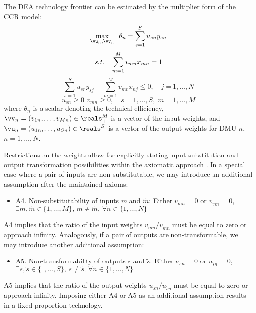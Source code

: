 {The DEA technology frontier can be estimated by the multiplier form of the CCR model:
\begin{equation}\label{eq:CCR}
\max_{\vu_n, \vv_n} \,\ \theta_{n}=\sum_{s=1}^S u_{sn} y_{sn}
\end{equation}
\begin{equation*}
\mbox{\textit{s.t.}}\quad
\sum_{m=1}^M v_{mn} x_{mn}=1    
\end{equation*}
\begin{equation*}
\sum_{s=1}^S u_{sn} y_{sj}-\sum_{m=1}^M v_{mn} x_{nj} \leq 0, \quad j = 1, \ldots, N
\end{equation*}
\begin{equation*}
u_{sn} \ge 0,v_{mn} \ge 0, \quad s = 1, \ldots, S, \; m = 1, \ldots, M
\end{equation*}
where $\theta_{n}$ is a scalar denoting the technical efficiency, $\vv_n = (v_{1n}, \ldots, v_{Mn}) \in \reals_+^M$ is a vector of the input weights, and $\vu_n = (u_{1n}, \ldots, u_{Sn}) \in \reals_+^S$ is a vector of the output weights for DMU $n$, $n = 1, \ldots, N$.

Restrictions on the weights allow for explicitly stating input substitution and output transformation possibilities within the axiomatic approach \parencite{Allen1997}. In a special case where a pair of inputs are non-substitutable, we may introduce an additional assumption after the maintained axioms:
\begin{itemize}
    \item[] A4. Non-substitutability of inputs $m$ and $\tilde{m}$: Either $v_{mn}=0$ or $v_{\tilde{m}n}=0$, $\exists m,\tilde{m} \in \{1,\ldots, M\},\, m \neq \tilde{m},\, \forall n \in \{1,\ldots, N\}$
\end{itemize}
A4 implies that the ratio of the input weights $v_{mn}/v_{\tilde{m}n}$ must be equal to zero or approach infinity. Analogously, if a pair of outputs are non-transformable, we may introduce another additional assumption:
\begin{itemize}
    \item[] A5. Non-transformability of outputs $s$ and $\tilde{s}$: Either $u_{sn}=0$ or $u_{\tilde{s}n}=0$, $\exists s,\tilde{s} \in \{1,\ldots, S\},\, s \neq \tilde{s},\, \forall n \in \{1,\ldots, N\}$
\end{itemize}
A5 implies that the ratio of the output weights $u_{sn}/u_{\tilde{s}n}$ must be equal to zero or approach infinity. Imposing either A4 or A5 as an additional assumption results in a fixed proportion technology.

}
